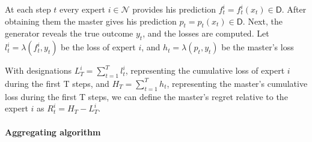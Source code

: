 \documentclass[12pt, twoside]{article}
\begin{document}
At each step $t$ every expert $i \in \mathcal{N}$ provides his prediction $f_t^i = f_t^i(x_t)  \in \mathsf{D}$. 
After obtaining them the master gives his prediction $p_t = p_t(x_t) \in \mathsf{D}$. 
Next, the generator reveals the true outcome $y_t$, and the losses are computed.
Let $l_t^i = \lambda(f_t^i, y_t)$ be the loss of expert $i$, and $h_t = \lambda(p_t, y_t)$ be the master's loss 

With designations $L_T^i = \sum_{t = 1}^T l_t^i$, representing the cumulative loss of expert $i$ during the first T steps, and $H_T = \sum_{t = 1}^T h_t$, 
representing the master's cumulative loss during the first T steps, we can define the master's regret relative to the expert $i$ as $R^i_t = H_T - L^i_T$. 

 
\paragraph{Aggregating algorithm}
\vspace{5mm}
\end{document}
